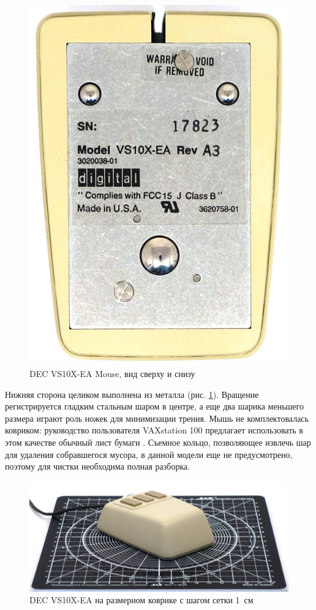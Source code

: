 \documentclass[11pt, a4paper]{article}
\begin{document}
\begin{figure}[h]
    \includegraphics[scale=0.5]{1983_dec_vs10x_ea_mouse/bottom_30.jpg}
    \caption{DEC VS10X-EA Mouse, вид сверху и снизу}
    \label{fig:DecVS10XTopAndBottom}
\end{figure}

Нижняя сторона целиком выполнена из металла (рис. \ref{fig:DecVS10XTopAndBottom}). Вращение регистрируется гладким стальным шаром в центре, а еще два шарика меньшего размера играют роль ножек для минимизации трения. Мышь не комплектовалась ковриком: руководство пользователя VAXstation 100 предлагает использовать в этом качестве обычный лист бумаги \cite{manual}.
 Съемное кольцо, позволяющее извлечь шар для удаления собравшегося мусора, в данной модели еще не предусмотрено, поэтому для чистки необходима полная разборка.

\begin{figure}[h]
    \centering
    \includegraphics[scale=0.7]{1983_dec_vs10x_ea_mouse/size_30.jpg}
    \caption{DEC VS10X-EA на размерном коврике с шагом сетки 1~см}
    \label{fig:DecVS10XSize}
\end{figure}
\end{document}
